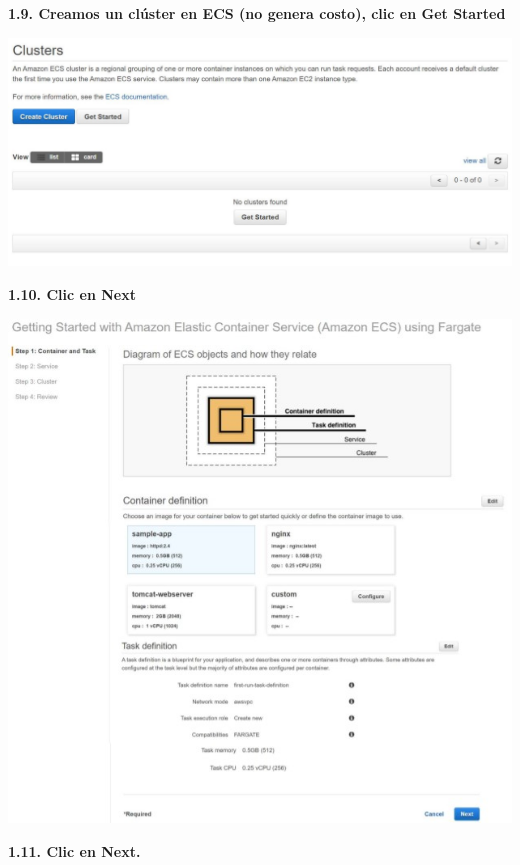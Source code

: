 \documentclass{article}
\begin{document}
	\newpage
\textbf{1.9.   Creamos un clúster en ECS (no genera costo), clic en Get Started
}

    \begin{center}
		\includegraphics[width=15cm]{./images/10} 
	\end{center}
	
		
	\newpage
\textbf{1.10.  Clic en Next
}

    \begin{center}
		\includegraphics[width=15cm]{./images/11} 
	\end{center}
	
	
		
	\newpage
\textbf{1.11. Clic en Next.
}
\end{document}
